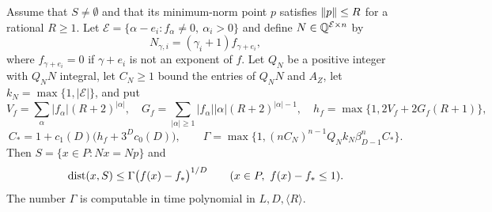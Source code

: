 \begin{lemma}\label{lem:points-error}
Assume that $S\ne\emptyset$ and that its minimum-norm point $p$ satisfies
$\left\lVert p\right\rVert\le R$ for a rational $R\ge1$. Let
$\mathcal E=\{\alpha-e_i:f_\alpha\ne0,\ \alpha_i>0\}$ and define
$N\in\mathbb Q^{\mathcal E\times n}$ by
\[
 N_{\gamma,i}=(\gamma_i+1)f_{\gamma+e_i},
\]
where $f_{\gamma+e_i}=0$ if $\gamma+e_i$ is not an exponent of $f$. Let
$Q_N$ be a positive integer with $Q_NN$ integral, let $C_N\ge1$ bound the
entries of $Q_NN$ and $A_Z$, let $k_N=\max\{1,|\mathcal E|\}$, and put
\[
 V_f=\sum_\alpha|f_\alpha|(R+2)^{|\alpha|},\quad
 G_f=\sum_{|\alpha|\ge1}|f_\alpha||\alpha|(R+2)^{|\alpha|-1},\quad
 h_f=\max\{1,2V_f+2G_f(R+1)\},
\]
\[
 C_*=1+c_1(D)\bigl(h_f+3^Dc_0(D)\bigr),\qquad
 \Gamma=\max\bigl\{1,(nC_N)^{n-1}Q_Nk_N\beta_{D-1}^nC_*\bigr\}.
\]
Then $S=\{x\in P:Nx=Np\}$ and
\[
 \operatorname{dist}(x,S)\le\Gamma\bigl(f(x)-f_*\bigr)^{1/D}\qquad
 (x\in P,\ f(x)-f_*\le1).
\]
The number $\Gamma$ is computable in time polynomial in $L,D,\langle R\rangle$.
\end{lemma}

